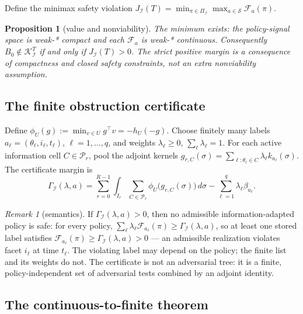 \documentclass[10pt,twocolumn]{article}
\theoremstyle{plain}
\newtheorem{proposition}[theorem]{Proposition}
\theoremstyle{definition}
\theoremstyle{remark}
\newtheorem{remark}[theorem]{Remark}
\begin{document}
Define the minimax safety violation
\(J_{\mathcal{I}}(T) = \min_{\pi \in \Pi_{\mathcal{I}}} \max_{a \in
\mathscr{S}} \mathcal{F}_a(\pi)\).

\begin{proposition}[value and nonviability]\label{prop:value}
The minimum exists: the policy-signal space is weak-* compact and each
\(\mathcal{F}_a\) is weak-* continuous. Consequently
\(B_0 \notin \mathcal{K}_{\mathcal{I}}^T\) if and only if
\(J_{\mathcal{I}}(T) > 0\). The strict positive margin is a consequence of
compactness and closed safety constraints, not an extra nonviability
assumption.
\end{proposition}

\subsection{The finite obstruction certificate}\label{certificate}

Define \(\phi_U(g) := \min_{v \in U} g^\top v = -h_U(-g)\). Choose finitely
many labels \(a_\ell = (\theta_\ell, i_\ell, t_\ell)\), \(\ell = 1,\dots,q\),
and weights \(\lambda_\ell \ge 0\), \(\sum_\ell \lambda_\ell = 1\). For each
active information cell \(C \in \mathcal{P}_r\), pool the adjoint kernels
\(g_{r,C}(\sigma) = \sum_{\ell : \theta_\ell \in C} \lambda_\ell
k_{a_\ell}(\sigma)\). The certificate margin is
\[
\Gamma_{\mathcal{I}}(\lambda, a)
= \sum_{r=0}^{R-1} \int_{I_r} \sum_{C \in \mathcal{P}_r}
\phi_U\!\bigl(g_{r,C}(\sigma)\bigr)\, d\sigma
- \sum_{\ell=1}^q \lambda_\ell \beta_{a_\ell}.
\tag{1}
\]

\begin{remark}[semantics]\label{rem:semantics}
If \(\Gamma_{\mathcal{I}}(\lambda, a) > 0\), then no admissible
information-adapted policy is safe: for every policy,
\(\sum_\ell \lambda_\ell \mathcal{F}_{a_\ell}(\pi) \ge
\Gamma_{\mathcal{I}}(\lambda, a)\), so at least one stored label satisfies
\(\mathcal{F}_{a_\ell}(\pi) \ge \Gamma_{\mathcal{I}}(\lambda, a) > 0\) ---
an admissible realization violates facet \(i_\ell\) at time \(t_\ell\). The
violating label may depend on the policy; the finite list and its weights do
not. The certificate is not an adversarial tree: it is a finite,
policy-independent set of adversarial tests combined by an adjoint identity.
\end{remark}

\subsection{The continuous-to-finite theorem}\label{bridge}
\end{document}
